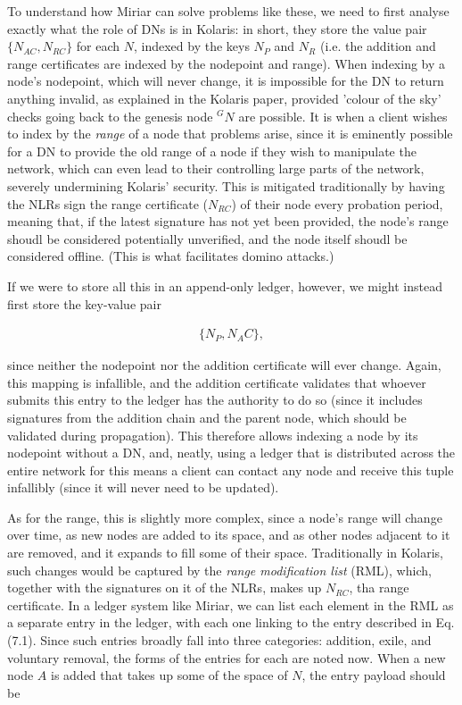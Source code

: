 \documentclass{extreport}
\begin{document}
To understand how Miriar can solve problems like these, we need to first analyse exactly what the role of DNs is in Kolaris: in short, they store the value pair \(\{ N_{AC}, N_{RC} \}\) for each \(N\), indexed by the keys \(N_P\) and \(N_R\) (i.e. the addition and range certificates are indexed by the nodepoint and range). When indexing by a node's nodepoint, which will never change, it is impossible for the DN to return anything invalid, as explained in the Kolaris paper, provided 'colour of the sky' checks going back to the genesis node \(^GN\) are possible. It is when a client wishes to index by the \emph{range} of a node that problems arise, since it is eminently possible for a DN to provide the old range of a node if they wish to manipulate the network, which can even lead to their controlling large parts of the network, severely undermining Kolaris' security. This is mitigated traditionally by having the NLRs sign the range certificate (\(N_{RC}\)) of their node every probation period, meaning that, if the latest signature has not yet been provided, the node's range shoudl be considered potentially unverified, and the node itself shoudl be considered offline. (This is what facilitates domino attacks.)

If we were to store all this in an append-only ledger, however, we might instead first store the key-value pair

\begin{align*}
\{ N_P, N_AC \}, \tag{7.1}
\end{align*}

since neither the nodepoint nor the addition certificate will ever change. Again, this mapping is infallible, and the addition certificate validates that whoever submits this entry to the ledger has the authority to do so (since it includes signatures from the addition chain and the parent node, which should be validated during propagation). This therefore allows indexing a node by its nodepoint without a DN, and, neatly, using a ledger that is distributed across the entire network for this means a client can contact any node and receive this tuple infallibly (since it will never need to be updated).

As for the range, this is slightly more complex, since a node's range will change over time, as new nodes are added to its space, and as other nodes adjacent to it are removed, and it expands to fill some of their space. Traditionally in Kolaris, such changes would be captured by the \emph{range modification list} (RML), which, together with the signatures on it of the NLRs, makes up \(N_{RC}\), tha range certificate. In a ledger system like Miriar, we can list each element in the RML as a separate entry in the ledger, with each one linking to the entry described in Eq. (7.1). Since such entries broadly fall into three categories: addition, exile, and voluntary removal, the forms of the entries for each are noted now. When a new node \(A\) is added that takes up some of the space of \(N\), the entry payload should be
\end{document}

